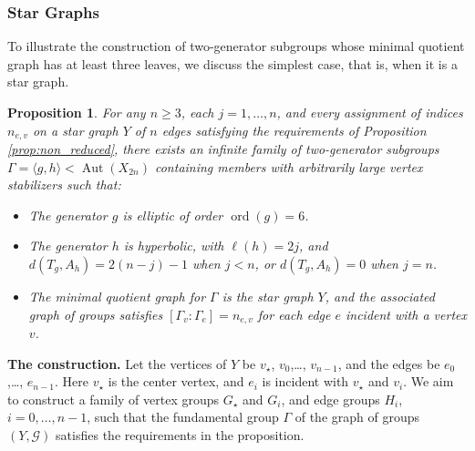 \documentclass[12pt,leqno]{amsart}
\newcommand{\2}{L^2_{\rm per}(0, T)}
\newtheorem{prop}{Proposition}[section]
\newcommand{\aut}{{\operatorname{Aut}}}
\newcommand{\ord}{{\operatorname{ord}}}
\numberwithin{equation}{section}
\numberwithin{figure}{section}
\begin{document}
\subsubsection{Star Graphs}
To illustrate the construction of two-generator subgroups whose minimal quotient graph has at least three leaves, we discuss the simplest case, that is, when it is a star graph.
\begin{prop}\label{thm:star}
    For any $n\geq 3$, each $j  = 1, \dots, n$, and every assignment of indices $n_{e,v}$ on a star graph $Y$ of $n$ edges satisfying the requirements of Proposition \ref{prop:non_reduced}, there exists an infinite family of two-generator subgroups $\Gamma = \langle g,h\rangle< \aut(X_{2n})$ containing members with arbitrarily large vertex stabilizers such that:
    \begin{itemize}
        \item The generator $g$ is elliptic of order $\ord(g)= 6$.
        \item The generator $h$ is hyperbolic, with $\ell(h) = 2j$, and $d(T_g,A_h) = 2(n-j)-1$ when $j<n$, or $d(T_g,A_h) = 0$ when $j=n$.
        \item The minimal quotient graph for $\Gamma$ is the star graph $Y$, and the associated graph of groups satisfies $[\Gamma_v : \Gamma_e] = n_{e,v}$ for each edge $e$ incident with a vertex $v$.
    \end{itemize}
\end{prop}
\textbf{The construction.} Let the vertices of $Y$ be $v_\star$, $v_0$,\dots, $v_{n-1}$, and the edges be $e_0$,\dots, $e_{n-1}$. Here $v_\star$ is the center vertex, and $e_i$ is incident with $v_\star$ and $v_i$. We aim to construct a family of vertex groups $G_\star$ and $G_i$, and edge groups $H_i$, $i=0,\dots, n-1$, such that the fundamental group $\Gamma$ of the graph of groups $(Y,\mathcal{G})$ satisfies the requirements in the proposition.
\end{document}
